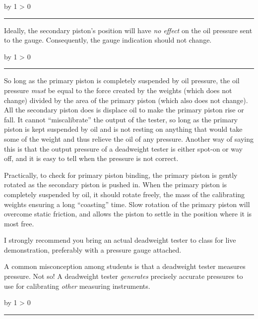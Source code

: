 \documentclass[12pt,a4paper]{article}
\def\oppgave{
            \advance\questnum by 1
            \ifnum \questnum > 0
                 \hrule
                 \vskip 3pt
                 \leftline{Oppgave \the\questnum}
                 \vskip 3pt \fi}
\def\svar{
           \advance\answnum by 1
           \ifnum \answnum > 0
                \hrule
                \vskip 3pt
                \leftline{Svar \the\answnum}
                \vskip 3pt \fi}
\def\notes{
           \advance\explnum by 1
           \ifnum \explnum > 0
                \hrule
                \vskip 3pt
                \leftline{Notes \the\explnum}
                \vskip 3pt \fi}
\begin{document}
\vskip 10pt \filbreak 





\svar{} 

Ideally, the secondary piston's position will have {\it no effect} on the oil pressure sent to the gauge.  Consequently, the gauge indication should not change.

\vskip 10pt \filbreak 





\notes{} 

So long as the primary piston is completely suspended by oil pressure, the oil pressure {\it must} be equal to the force created by the weights (which does not change) divided by the area of the primary piston (which also does not change).  All the secondary piston does is displace oil to make the primary piston rise or fall.  It cannot ``miscalibrate'' the output of the tester, so long as the primary piston is kept suspended by oil and is not resting on anything that would take some of the weight and thus relieve the oil of any pressure.  Another way of saying this is that the output pressure of a deadweight tester is either spot-on or way off, and it is easy to tell when the pressure is not correct.

Practically, to check for primary piston binding, the primary piston is gently rotated as the secondary piston is pushed in.  When the primary piston is completely suspended by oil, it should rotate freely, the mass of the calibrating weights ensuring a long ``coasting'' time.  Slow rotation of the primary piston will overcome static friction, and allows the piston to settle in the position where it is most free.

I strongly recommend you bring an actual deadweight tester to class for live demonstration, preferably with a pressure gauge attached.  

\vskip 10pt

A common misconception among students is that a deadweight tester measures pressure.  Not so!  A deadweight tester {\it generates} precisely accurate pressures to use for calibrating {\it other} measuring instruments.


\vfil \eject 



\oppgave{} 
\end{document}
